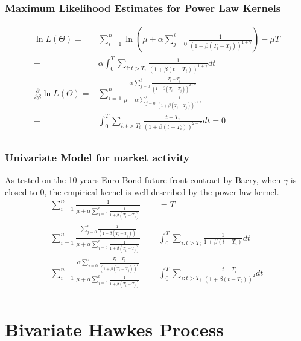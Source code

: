 \documentclass{beamer}
\begin{document}
\begin{frame}
\frametitle{Maximum Likelihood Estimates for Power Law Kernels}
\begin{equation*}
\begin{split}
\ln L(\Theta) = &\sum_{i=1}^n \ln(\mu + \alpha\sum_{j=0}^i \frac{1}{(1 + \beta (T_i - T_j))^{1 + \gamma}}) - \mu T\\
- &\alpha \int_{0}^{T} \sum_{i: t>T_i} \frac{1}{(1 + \beta (t - T_i))^{1 + \gamma}} dt\\[7mm]
\frac{\partial}{\partial \beta} \ln L(\Theta) = &\sum_{i=1}^n \frac{\alpha\sum_{j=0}^i \frac{T_i - T_j}{(1 + \beta (T_i - T_j))^{2 + \gamma}}}{\mu + \alpha\sum_{j=0}^i \frac{1}{(1 + \beta (T_i - T_j))^{1 + \gamma}}}\\
- &\int_{0}^{T} \sum_{i: t>T_i} \frac{t - T_i}{(1 + \beta (t - T_i))^{2 + \gamma}} dt = 0\\
\end{split}
\end{equation*}
\end{frame}

\begin{frame}
\frametitle{Univariate Model for market activity}
As tested on the 10 years Euro-Bond future front contract by Bacry, when $\gamma$ is closed to $0$, the empirical kernel is well described by the power-law kernel.
\begin{equation*}
\begin{split}
\sum_{i=1}^n \frac{1}{\mu + \alpha\sum_{j=0}^i \frac{1}{1 + \beta (T_i - T_j)}} &= T\\
\sum_{i=1}^n \frac{\sum_{j=0}^i \frac{1}{(1 + \beta (T_i - T_j))}}{\mu + \alpha\sum_{j=0}^i \frac{1}{1 + \beta (T_i - T_j)}} = &\int_{0}^{T} \sum_{i: t>T_i} \frac{1}{1 + \beta (t - T_i)} dt\\
\sum_{i=1}^n \frac{\alpha\sum_{j=0}^i \frac{T_i - T_j}{(1 + \beta (T_i - T_j))^2}}{\mu + \alpha\sum_{j=0}^i \frac{1}{1 + \beta (T_i - T_j)}} = &\int_{0}^{T} \sum_{i: t>T_i} \frac{t - T_i}{(1 + \beta (t - T_i))^2} dt\\
\end{split}
\end{equation*}
\end{frame}

\section{Bivariate Hawkes Process}
\end{document}

